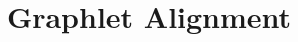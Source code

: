 \documentclass[11pt,a4paper]{article}
\title{Graphlet Alignment}
\date{}
\begin{document}
\maketitle

\begin{abstract}
\end{abstract}





%
%







\end{document}
